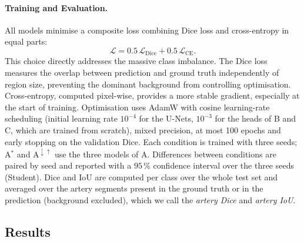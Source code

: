 \documentclass[conference]{IEEEtran}
\begin{document}
\paragraph{Training and Evaluation.}
All models minimise a composite loss combining Dice loss and cross-entropy in equal parts:
\begin{equation}
\mathcal{L} = 0.5\,\mathcal{L}_{\text{Dice}} + 0.5\,\mathcal{L}_{\text{CE}}.
\end{equation}
This choice directly addresses the massive class imbalance. The Dice loss \cite{milletari2016vnet} measures the overlap between prediction and ground truth independently of region size, preventing the dominant background from controlling optimisation. Cross-entropy, computed pixel-wise, provides a more stable gradient, especially at the start of training. Optimisation uses AdamW with cosine learning-rate scheduling (initial learning rate $10^{-4}$ for the U-Nets, $10^{-3}$ for the heads of B and C, which are trained from scratch), mixed precision, at most 100 epochs and early stopping on the validation Dice. Each condition is trained with three seeds; A$^{*}$ and A$^{\downarrow\uparrow}$ use the three models of A. Differences between conditions are paired by seed and reported with a $95\,\%$ confidence interval over the three seeds (Student). Dice and IoU are computed per class over the whole test set and averaged over the artery segments present in the ground truth or in the prediction (background excluded), which we call the \emph{artery Dice} and \emph{artery IoU}.

\subsection{Results}
\end{document}
